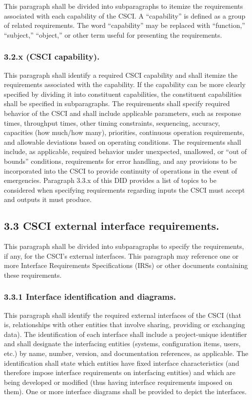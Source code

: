This paragraph shall be divided into subparagraphs to itemize the
requirements associated with each capability of the CSCI. A
``capability'' is defined as a group of related requirements. The word
``capability'' may be replaced with ``function,'' ``subject,''
``object,'' or other term useful for presenting the requirements.

\subsubsection{3.2.x (CSCI capability).}

This paragraph shall identify a required CSCI capability and shall
itemize the requirements associated with the capability. If the
capability can be more clearly specified by dividing it into constituent
capabilities, the constituent capabilities shall be specified in
subparagraphs. The requirements shall specify required behavior of the
CSCI and shall include applicable parameters, such as response times,
throughput times, other timing constraints, sequencing, accuracy,
capacities (how much/how many), priorities, continuous operation
requirements, and allowable deviations based on operating conditions.
The requirements shall include, as applicable, required behavior under
unexpected, unallowed, or ``out of bounds'' conditions, requirements for
error handling, and any provisions to be incorporated into the CSCI to
provide continuity of operations in the event of emergencies. Paragraph
3.3.x of this DID provides a list of topics to be considered when
specifying requirements regarding inputs the CSCI must accept and
outputs it must produce.

\subsection{3.3 CSCI external interface requirements.}

This paragraph shall be divided into subparagraphs to specify the
requirements, if any, for the CSCI's external interfaces. This paragraph
may reference one or more Interface Requirements Specifications (IRSs)
or other documents containing these requirements.

\subsubsection{3.3.1 Interface identification and diagrams.}

This paragraph shall identify the required external interfaces of the
CSCI (that is, relationships with other entities that involve sharing,
providing or exchanging data). The identification of each interface
shall include a project-unique identifier and shall designate the
interfacing entities (systems, configuration items, users, etc.) by
name, number, version, and documentation references, as applicable. The
identification shall state which entities have fixed interface
characteristics (and therefore impose interface requirements on
interfacing entities) and which are being developed or modified (thus
having interface requirements imposed on them). One or more interface
diagrams shall be provided to depict the interfaces.


